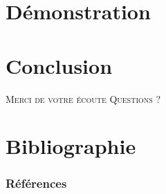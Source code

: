 \documentclass{cubeamer}
\begin{document}
\section{Démonstration}

\section{Conclusion}

\begin{frame}[standout]
    \Huge\textsc{Merci de votre écoute}
    \vfill
    \LARGE\textsc{Questions ?}
\end{frame}

\section*{Bibliographie}

\begin{frame}[allowframebreaks]
    \frametitle{Références}
    \nocite{*}
    
    
\end{frame}
\end{document}
